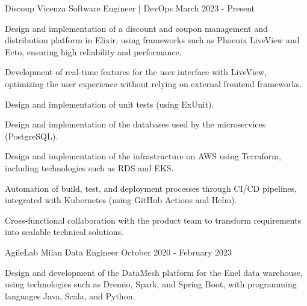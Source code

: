 \documentclass{resume} %
\begin{document}


\cvEntry
  {Discoup}
  {Vicenza}
  {Software Engineer | DevOps}
  {March 2023 - Present}{
    \begin{cvEntryItems}
      \item Design and implementation of a discount and coupon management and distribution
            platform in Elixir, using frameworks such as Phoenix LiveView and Ecto,
            ensuring high reliability and performance.
      \item Development of real-time features for the user interface with LiveView,
            optimizing the user experience without relying on external frontend frameworks.
      \item Design and implementation of unit tests (using ExUnit).
      \item Design and implementation of the databases used by the microservices (PostgreSQL).
      \item Design and implementation of the infrastructure on AWS using Terraform,
            including technologies such as RDS and EKS.
      \item Automation of build, test, and deployment processes through CI/CD pipelines,
            integrated with Kubernetes (using GitHub Actions and Helm).
      \item Cross-functional collaboration with the product team to transform requirements
            into scalable technical solutions.
    \end{cvEntryItems}
}


\cvEntry
  {AgileLab}
  {Milan}
  {Data Engineer}
  {October 2020 - February 2023}{
    \begin{cvEntryItems}
      \item Design and development of the DataMesh platform for the Enel data warehouse,
            using technologies such as Dremio, Spark, and Spring Boot,
            with programming languages Java, Scala, and Python.
    \end{cvEntryItems}
  }
\end{document}
